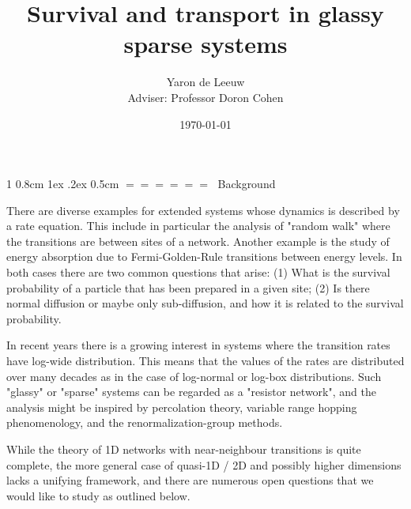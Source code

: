 \documentclass[onecolumn,fleqn,notitlepage,secnumarabic]{revtex4}
\makeatletter
\def\section{%
  \@startsection
    {section}%
    {1}%
    {\z@}%
    {0.8cm \@plus1ex \@minus .2ex}%
    {0.5cm}%
    {\Large\bf $=\!=\!=\!=\!=\!=\;$}%
}%
\makeatother
\begin{document}
\title{Survival and transport in glassy sparse systems}


\author{Yaron de Leeuw  \\Adviser: Professor Doron Cohen }
\date{\today}
\maketitle


\section{Background}

There are diverse examples for extended systems whose dynamics is described by a rate equation. This include in particular the analysis of "random walk" where the transitions are between sites of a network. Another example is the study of energy absorption due to Fermi-Golden-Rule transitions between energy levels. In both cases there are two common questions that arise: (1) What is the survival probability of a particle  that has been prepared in a given site; (2) Is there normal diffusion or maybe only sub-diffusion, and how it is related to the survival probability.

In recent years there is a growing interest in systems where the transition rates have log-wide distribution. This means that the values of the rates
are distributed over many decades as in the case of log-normal or log-box distributions. Such "glassy" or "sparse" systems can be regarded as a "resistor network", and the analysis might be inspired by percolation theory, variable range hopping phenomenology, and the renormalization-group methods.

While the theory of 1D networks with near-neighbour transitions is quite complete, the more general case of quasi-1D / 2D and possibly higher dimensions lacks a unifying framework, and there are numerous open questions that we would like to study as outlined below.
\end{document}
